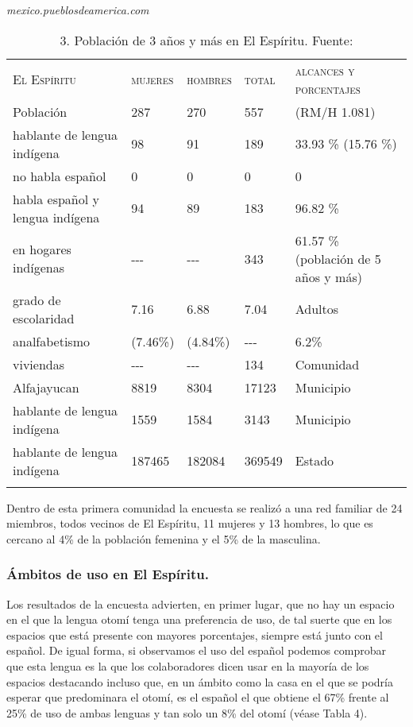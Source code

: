 \documentclass[output=paper]{../langscibook}
\begin{document}
\begin{table}
\caption{\label{tab:guerrero}3. Población de 3 años y más en El Espíritu. Fuente: \citet{INEGI2010}} \textit{mexico.pueblosdeamerica.com}
\begin{tabularx}{\textwidth}{XXXXX}
\lsptoprule
{\textsc{El} \textsc{Espíritu} } & {\textsc{mujeres}} & {\textsc{hombres}} & {\textsc{total}} & {\textsc{alcances} \textsc{y} \textsc{porcentajes}}\\
{Población} & {287} & {270} & {557} & {(RM/H 1.081)}\\
{hablante de lengua indígena} & {98} & {91} & {189} & {33.93 \% (15.76 \%)}\\
{no habla español} & {0} & {0} & {0} & {0}\\
{habla español y lengua indígena} & {94} & {89} & {183} & {96.82 \%}\\
{en hogares indígenas} & {{}-{}-{}-} & {{}-{}-{}-} & {343}  & {61.57 \% (población de 5 años y más)}\\
{grado de escolaridad} & {7.16} & {6.88} & {7.04}  & {Adultos}\\
{analfabetismo} & {(7.46\%)} & {(4.84\%)} & {{}-{}-{}-} & {6.2\%}\\
{viviendas} & {{}-{}-{}-} & {{}-{}-{}-} & {134} & {Comunidad}\\
{Alfajayucan} & {8819} & {8304} & {17123} & {Municipio}\\
{hablante de lengua indígena} & {1559} & {1584} & {3143} & {Municipio}\\
{hablante de lengua indígena} & {187465} & {182084} & {369549} & {Estado}\\
\lspbottomrule
\end{tabularx}
\end{table}

Dentro de esta primera comunidad la encuesta se realizó a una red familiar de 24 miembros, todos vecinos de El Espíritu, 11 mujeres y 13 hombres, lo que es cercano al 4\% de la población femenina y el 5\% de la masculina.


 \subsubsection{Ámbitos de uso en El Espíritu.}


Los resultados de la encuesta advierten, en primer lugar, que no hay un espacio en el que la lengua otomí tenga una preferencia de uso, de tal suerte que en los espacios que está presente con mayores porcentajes, siempre está junto con el español. De igual forma, si observamos el uso del español podemos comprobar que esta lengua es la que los colaboradores dicen usar en la mayoría de los espacios destacando incluso que, en un ámbito como la casa en el que se podría esperar que predominara el otomí, es el español el que obtiene el 67\% frente al 25\% de uso de ambas lenguas y tan solo un 8\% del otomí (véase Tabla 4).
\end{document}

